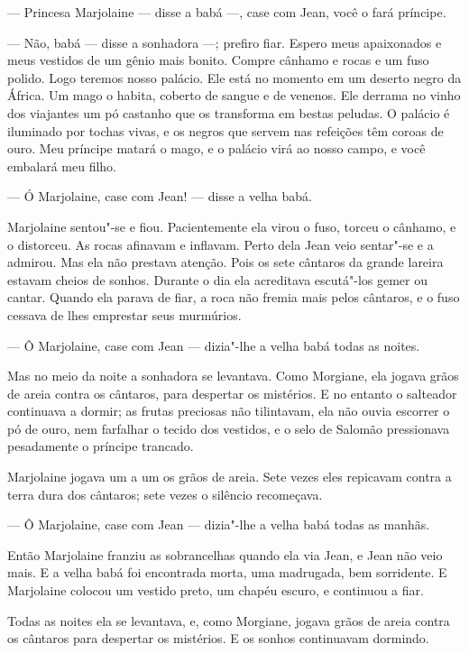 --- Princesa Marjolaine --- disse a babá ---, case com Jean, você o fará
príncipe.

--- Não, babá --- disse a sonhadora ---; prefiro fiar. Espero meus apaixonados
e meus vestidos de um gênio mais bonito. Compre cânhamo e rocas e um fuso
polido. Logo teremos nosso palácio. Ele está no momento em um deserto
negro da África. Um mago o habita, coberto de sangue e de venenos. Ele
derrama no vinho dos viajantes um pó castanho que os transforma em bestas
peludas. O palácio é iluminado por tochas vivas, e os negros que servem
nas refeições têm coroas de ouro. Meu príncipe matará o mago, e o palácio
virá ao nosso campo, e você embalará meu filho.

--- Ó Marjolaine, case com Jean! --- disse a velha babá.

Marjolaine sentou"-se e fiou. Pacientemente ela virou o fuso, torceu o
cânhamo, e o distorceu. As rocas afinavam e inflavam. Perto dela Jean
veio sentar"-se e a admirou. Mas ela não prestava atenção. Pois os sete
cântaros da grande lareira estavam cheios de sonhos. Durante o dia ela
acreditava escutá"-los gemer ou cantar. Quando ela parava de fiar, a roca
não fremia mais pelos cântaros, e o fuso cessava de lhes emprestar seus
murmúrios.

--- Ô Marjolaine, case com Jean --- dizia"-lhe a velha babá todas as noites.

Mas no meio da noite a sonhadora se levantava. Como Morgiane, ela
jogava grãos de areia contra os cântaros, para despertar os mistérios. E
no entanto o salteador continuava a dormir; as frutas preciosas não
tilintavam, ela não ouvia escorrer o pó de ouro, nem farfalhar o tecido
dos vestidos, e o selo de Salomão pressionava pesadamente o príncipe
trancado.

Marjolaine jogava um a um os grãos de areia. Sete vezes eles repicavam
contra a terra dura dos cântaros; sete vezes o silêncio recomeçava.

--- Ô Marjolaine, case com Jean --- dizia"-lhe a velha babá todas as
manhãs.

Então Marjolaine franziu as sobrancelhas quando ela via Jean, e Jean
não veio mais. E a velha babá foi encontrada morta, uma madrugada, bem
sorridente. E Marjolaine colocou um vestido preto, um chapéu escuro, e
continuou a fiar.

Todas as noites ela se levantava, e, como Morgiane, jogava grãos de
areia contra os cântaros para despertar os mistérios. E os sonhos continuavam dormindo.

